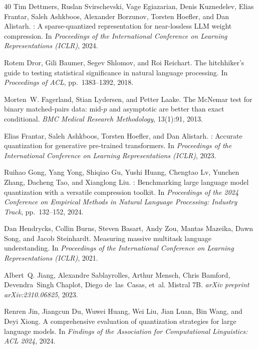 \documentclass{article}
\begin{document}
\begin{thebibliography}{40}
Tim Dettmers, Ruslan Svirschevski, Vage Egiazarian, Denis Kuznedelev, Elias Frantar, Saleh Ashkboos, Alexander Borzunov, Torsten Hoefler, and Dan Alistarh.
: A sparse-quantized representation for near-lossless {LLM} weight compression.
\newblock In \emph{Proceedings of the International Conference on Learning Representations (ICLR)}, 2024.

Rotem Dror, Gili Baumer, Segev Shlomov, and Roi Reichart.
\newblock The hitchhiker's guide to testing statistical significance in natural language processing.
\newblock In \emph{Proceedings of ACL}, pp.\ 1383--1392, 2018.

Morten~W. Fagerland, Stian Lydersen, and Petter Laake.
\newblock The {McNemar} test for binary matched-pairs data: mid-$p$ and asymptotic are better than exact conditional.
\newblock \emph{BMC Medical Research Methodology}, 13(1):91, 2013.

Elias Frantar, Saleh Ashkboos, Torsten Hoefler, and Dan Alistarh.
: Accurate quantization for generative pre-trained transformers.
\newblock In \emph{Proceedings of the International Conference on Learning Representations (ICLR)}, 2023.

Ruihao Gong, Yang Yong, Shiqiao Gu, Yushi Huang, Chengtao Lv, Yunchen Zhang, Dacheng Tao, and Xianglong Liu.
: Benchmarking large language model quantization with a versatile compression toolkit.
\newblock In \emph{Proceedings of the 2024 Conference on Empirical Methods in Natural Language Processing: Industry Track}, pp.\ 132--152, 2024.

Dan Hendrycks, Collin Burns, Steven Basart, Andy Zou, Mantas Mazeika, Dawn Song, and Jacob Steinhardt.
\newblock Measuring massive multitask language understanding.
\newblock In \emph{Proceedings of the International Conference on Learning Representations (ICLR)}, 2021.

Albert~Q. Jiang, Alexandre Sablayrolles, Arthur Mensch, Chris Bamford, Devendra~Singh Chaplot, Diego de~las~Casas, et~al.
\newblock Mistral 7B.
\newblock \emph{arXiv preprint arXiv:2310.06825}, 2023.

Renren Jin, Jiangcun Du, Wuwei Huang, Wei Liu, Jian Luan, Bin Wang, and Deyi Xiong.
\newblock A comprehensive evaluation of quantization strategies for large language models.
\newblock In \emph{Findings of the Association for Computational Linguistics: ACL 2024}, 2024.


\end{thebibliography}
\end{document}

